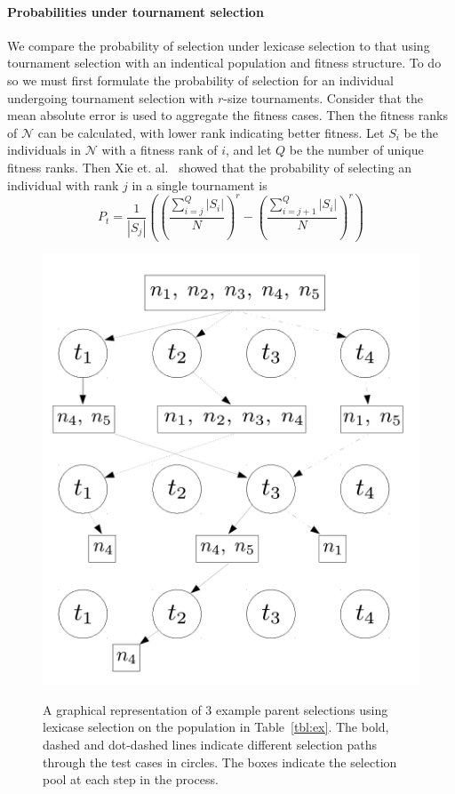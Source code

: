 \documentclass[preprint]{article}
\begin{document}
\paragraph{Probabilities under tournament selection} We compare the probability of selection under lexicase selection to that using tournament selection with an indentical population and fitness structure. To do so we must first formulate the probability of selection for an individual undergoing tournament selection with $r$-size tournaments. Consider that the mean absolute error is used to aggregate the fitness cases. Then the fitness ranks of $\mathcal{N}$ can be calculated, with lower rank indicating better fitness. Let $S_i$ be the individuals in $\mathcal{N}$ with a fitness rank of $i$, and let $Q$ be the number of unique fitness ranks. Then Xie et. al.~\cite{xie_another_2007} showed that the probability of selecting an individual with rank $j$ in a single tournament is 
\begin{equation}
P_t = \frac{1}{|S_j|}\left( \left(\frac{\sum_{i=j}^Q{|S_i|}}{N}\right)^r - \left(\frac{\sum_{i=j+1}^Q{|S_i|}}{N}\right)^r \right)
\end{equation}



\begin{figure}
\centering
  \includegraphics[height = 0.4\textheight]{figs/lex_graph.pdf}\\
  \caption{A graphical representation of 3 example parent selections using lexicase selection on the population in Table~\ref{tbl:ex}. The bold, dashed and dot-dashed lines indicate different selection paths through the test cases in circles. The boxes indicate the selection pool at each step in the process.}\label{fig:boxplot_eps_e}
\end{figure}
\end{document}
